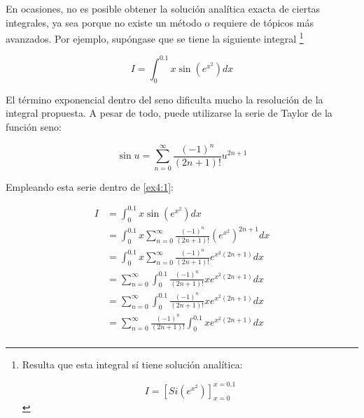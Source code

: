 \begin{ex}

    En ocasiones, no es posible obtener la solución analítica exacta de
    ciertas integrales, ya sea porque no existe un método o requiere de
    tópicos más avanzados. Por ejemplo, supóngase que se tiene la siguiente
    integral \footnote{
        Resulta que esta integral sí tiene solución
        analítica: 

        \[
            I = \left[Si(e^{x^2})\right]_{x=0}^{x=0.1}
        \]
    }

    \begin{equation}\label{ex4:1}
        I = \int_{0}^{0.1} x \sin(e^{x^2}) dx
    \end{equation}

    \begin{solution}

        El término exponencial dentro del seno dificulta mucho la resolución de
        la integral propuesta. A pesar de todo, puede utilizarse la serie de
        Taylor de la función seno:

        \begin{equation*}
            \sin u = \sum_{n = 0}^{\infty} \frac{(-1)^n}{(2n + 1)!} u^{2n +
            1}
        \end{equation*}

        Empleando esta serie dentro de \ref{ex4:1}:

        \begin{align*}
            I &= \int_{0}^{0.1} x \sin(e^{x^2}) dx \\
              &= \int_{0}^{0.1} x \sum_{n = 0}^{\infty} \frac{(-1)^n}{(2n +
              1)!} (e^{x^2})^{2n + 1} dx \\
              &= \int_{0}^{0.1} x \sum_{n = 0}^{\infty} \frac{(-1)^n}{(2n +
              1)!} e^{x^2(2n + 1)} dx \\
              &= \sum_{n = 0}^{\infty} \int_{0}^{0.1} \frac{(-1)^n}{(2n +
              1)!} x e^{x^2(2n + 1)} dx \\
              &= \sum_{n = 0}^{\infty} \int_{0}^{0.1} \frac{(-1)^n}{(2n +
              1)!} x e^{x^2(2n + 1)} dx \\
              &= \sum_{n = 0}^{\infty} \frac{(-1)^n}{(2n + 1)!}
              \int_{0}^{0.1} x e^{x^2(2n + 1)} dx \\
        \end{align*}


\end{solution}
\end{ex}
